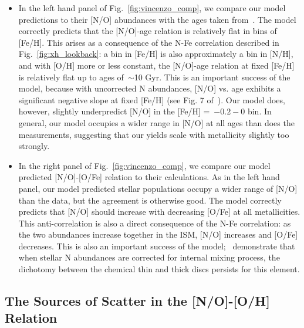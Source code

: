 \documentclass[ms.tex]{subfiles}
\begin{document}
\begin{itemize}
	\item In the left hand panel of Fig.~\ref{fig:vincenzo_comp}, we compare 
	our model predictions to their [N/O] abundances with the ages taken 
	from~\citet{Miglio2021}. 
	The model correctly predicts that the [N/O]-age relation is relatively flat 
	in bins of [Fe/H]. 
	This arises as a consequence of the N-Fe correlation described in 
	Fig.~\ref{fig:xh_lookback}: a bin in [Fe/H] is also approximately a bin in 
	[N/H], and with [O/H] more or less constant, the [N/O]-age relation at 
	fixed [Fe/H] is relatively flat up to ages of~$\sim$10 Gyr. 
	This is an important success of the model, because with uncorrected N 
	abundances, [N/O] vs. age exhibits a significant negative slope at fixed 
	[Fe/H] (see Fig. 7 of~\citealp{Vincenzo2021}). 
	Our model does, however, slightly underpredict [N/O] in the 
	[Fe/H] =~$-0.2 - 0$ bin. 
	In general, our model occupies a wider range in [N/O] at all ages than does 
	the~\citet{Vincenzo2021} measurements, suggesting that our yields scale 
	with metallicity slightly too strongly. 

	\item In the right panel of Fig.~\ref{fig:vincenzo_comp}, we compare 
	our model predicted [N/O]-[O/Fe] relation to their calculations. 
	As in the left hand panel, our model predicted stellar populations occupy a 
	wider range of [N/O] than the data, but the agreement is otherwise good. 
	The model correctly predicts that [N/O] should increase with decreasing 
	[O/Fe] at all metallicities. 
	This anti-correlation is also a direct consequence of the N-Fe correlation: 
	as the two abundances increase together in the ISM, [N/O] increases and 
	[O/Fe] decreases. 
	This is also an important success of the model;~\citet{Vincenzo2021} 
	demonstrate that when stellar N abundances are corrected for internal 
	mixing process, the dichotomy between the chemical thin and thick discs 
	persists for this element. 

\end{itemize} 

\subsection{The Sources of Scatter in the [N/O]-[O/H] Relation} 
\label{sec:results:schaefer_comp} 
\end{document}
